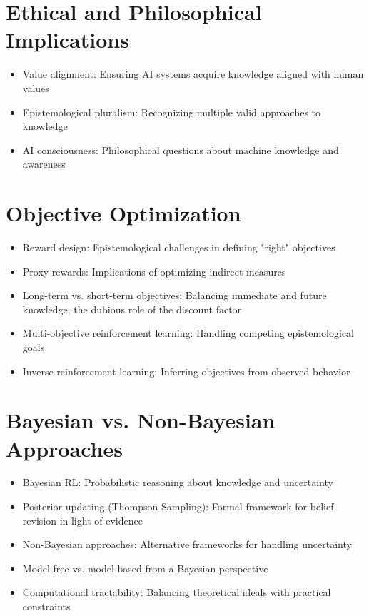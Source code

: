 \section{Ethical and Philosophical Implications}
\begin{itemize}
    \item Value alignment: Ensuring AI systems acquire knowledge aligned with human values
    \item Epistemological pluralism: Recognizing multiple valid approaches to knowledge
    \item AI consciousness: Philosophical questions about machine knowledge and awareness
\end{itemize}

\section{Objective Optimization}
\begin{itemize}
    \item Reward design: Epistemological challenges in defining "right" objectives
    \item Proxy rewards: Implications of optimizing indirect measures
    \item Long-term vs. short-term objectives: Balancing immediate and future knowledge, the dubious role of the discount factor
    \item Multi-objective reinforcement learning: Handling competing epistemological goals
    \item Inverse reinforcement learning: Inferring objectives from observed behavior
\end{itemize}

\section{Bayesian vs. Non-Bayesian Approaches}
\begin{itemize}
    \item Bayesian RL: Probabilistic reasoning about knowledge and uncertainty
    \item Posterior updating (Thompson Sampling): Formal framework for belief revision in light of evidence
    \item Non-Bayesian approaches: Alternative frameworks for handling uncertainty
    \item Model-free vs. model-based from a Bayesian perspective
    \item Computational tractability: Balancing theoretical ideals with practical constraints
\end{itemize}

